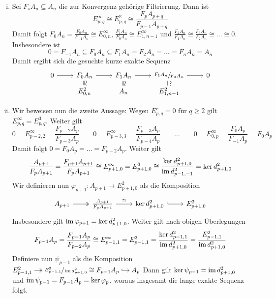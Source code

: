 \begin{beweis}
	\begin{enumerate}[(i)]
		\item Sei $F_s A_n \subseteq A_n$ die zur Konvergenz gehörige Filtrierung. 
		Dann ist 
		\[
			E^\infty_{p,q} \cong E_{p,q}^2 \cong \frac{F_p A_{p+q}}{F_{p-1}A_{p+q}} 
		\]
		Damit folgt $F_0 A_n = \frac{F_0 A_n}{F_{-1} A_n} \cong E^\infty_{0,n}$, $\frac{F_1 A_n}{F_0 A_n} \cong E^\infty_{1,n-1}$ und $\frac{F_{2}A_n}{F_{1}A_n} \cong \frac{F_{3} A_n}{F_{2} A_n} \cong \ldots \cong 0$.
		Insbesondere ist 
		\[
			0 = F_{-1} A_n \subseteq F_0 A_n \subseteq F_1 A_n = F_{2}A_n = \ldots = F_{n} A_n = A_n
		\]
		Damit ergibt sich die gesuchte kurze exakte Sequenz
		\[
			\begin{tikzcd}[row sep=5pt]
				0 \rar & F_{0} A_n \rar \dar[phantom,"\cong", sloped] & F_1 A_n \rar\dar[phantom,"\cong", sloped] & \sfrac{F_1 A_n}{F_{0} A_n} \rar\dar[phantom,"\cong", sloped] &0  \\
				& E^2_{0,n} & A_n & E_{1,n-1}^2
			\end{tikzcd}
		\]
		\item Wir beweisen nun die zweite Aussage:
		Wegen $E^r_{p,q}=0$ für $q \ge 2$ gilt $E^\infty_{p,q}=E^3_{p,q}$.
		Weiter gilt
		\[
			0 = E^\infty_{p-2,2}= \frac{F_{p-2} A_p}{F_{p-3} A_p} \qquad 0 = E^\infty_{p-3,3} = \frac{F_{p-3}A_p}{F_{p-4}A_p} \qquad \ldots \qquad 0=E^\infty_{0,p} = \frac{F_0 A_p}{F_{-1} A_p} = F_0 A_p
		\]
		Damit folgt $0=F_0 A_p = \ldots = F_{p-2} A_p$.
		Weiter gilt
		\[
			\frac{A_{p+1}}{F_p A_{p+1}} = \frac{F_{p+1}A_{p+1}}{F_p A_{p+1}} \cong E^\infty_{p+1,0} = E^3_{p+1,0} \cong \frac{\ker d^2_{p+1,0}}{\operatorname{im} d^2_{p-1,-1}} = \ker d^2_{p+1,0}
		\]
		Wir definieren nun $\varphi_{p+1} \colon A_{p+1} \to E^2_{p+1,0}$ als die Komposition
		\[
			\begin{tikzcd}
				A_{p+1} \rar[two heads] & \frac{A_{p+1}}{F_p A_{p+1}} \rar["\cong"] & \ker d^2_{p+1,0} \rar[hook] & E^2_{p+1,0}
			\end{tikzcd}
		\]
		Insbesondere gilt $\operatorname{im} \varphi_{p+1} = \ker d^2_{p+1,0}$.
		Weiter gilt nach obigen Überlegungen
		\[
			F_{p-1} A_p = \frac{F_{p-1}A_p}{F_{p-2} A_p} \cong E^\infty_{p-1,1} = E^3_{p-1,1} = \frac{\ker d^2_{p-1,1}}{\operatorname{im} d^2_{p+1,0}} = \frac{E^2_{p-1,1}}{\operatorname{im} d^2_{p+1,0}}  
		\]
		Definiere nun $\psi_{p-1}$ als die Komposition
		\(
			\begin{tikzcd}[cramped,sep=small]
				E^2_{p-1,1} \rar[two heads] & \sfrac{E^2_{p-1,1}}{\im d^2_{p+1,0}} \cong F_{p-1} A_p \rar[hook] & A_p  
			\end{tikzcd}
		\)
		Dann gilt $\ker \psi_{p-1}= \operatorname{im} d^2_{p+1,0}$ und $\operatorname{im} \psi_{p-1}= F_{p-1} A_p = \ker \varphi_p$, woraus insgesamt die lange exakte Sequenz folgt.\qedhere
	\end{enumerate}
\end{beweis}

